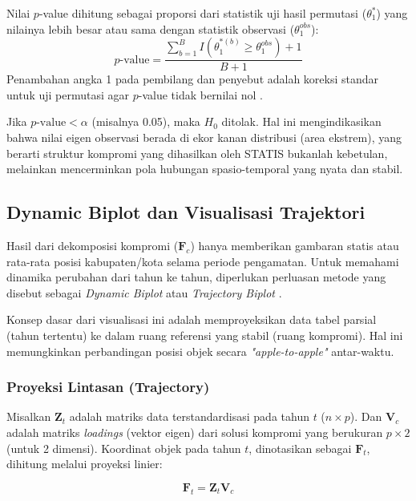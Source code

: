 \documentclass[a4paper]{article}
\theoremstyle{definition} %
\begin{document}
\begin{enumerate}
    Nilai $p$-value dihitung sebagai proporsi dari statistik uji hasil permutasi ($\theta_1^*$) yang nilainya lebih besar atau sama dengan statistik observasi ($\theta_1^{obs}$):
    \begin{equation}
        p\text{-value} = \frac{\sum_{b=1}^{B} I(\theta_1^{*(b)} \ge \theta_1^{obs}) + 1}{B + 1}
    \end{equation}
    Penambahan angka 1 pada pembilang dan penyebut adalah koreksi standar untuk uji permutasi agar $p$-value tidak bernilai nol \citep{phipson2010}.
    
    Jika $p\text{-value} < \alpha$ (misalnya 0.05), maka $H_0$ ditolak. Hal ini mengindikasikan bahwa nilai eigen observasi berada di ekor kanan distribusi (area ekstrem), yang berarti struktur kompromi yang dihasilkan oleh STATIS bukanlah kebetulan, melainkan mencerminkan pola hubungan spasio-temporal yang nyata dan stabil.
    
\end{enumerate}

\subsection{Dynamic Biplot dan Visualisasi Trajektori}

Hasil dari dekomposisi kompromi ($\mathbf{F}_c$) hanya memberikan gambaran statis atau rata-rata posisi kabupaten/kota selama periode pengamatan. Untuk memahami dinamika perubahan dari tahun ke tahun, diperlukan perluasan metode yang disebut sebagai \textit{Dynamic Biplot} atau \textit{Trajectory Biplot} \citep{egido2015}.

Konsep dasar dari visualisasi ini adalah memproyeksikan data tabel parsial (tahun tertentu) ke dalam ruang referensi yang stabil (ruang kompromi). Hal ini memungkinkan perbandingan posisi objek secara \textit{"apple-to-apple"} antar-waktu.

\subsubsection{Proyeksi Lintasan (Trajectory)}

Misalkan $\mathbf{Z}_t$ adalah matriks data terstandardisasi pada tahun $t$ ($n \times p$). Dan $\mathbf{V}_c$ adalah matriks \textit{loadings} (vektor eigen) dari solusi kompromi yang berukuran $p \times 2$ (untuk 2 dimensi). Koordinat objek pada tahun $t$, dinotasikan sebagai $\mathbf{F}_t$, dihitung melalui proyeksi linier:

\begin{equation}
	\mathbf{F}_t = \mathbf{Z}_t \mathbf{V}_c
\end{equation}
\end{document}
